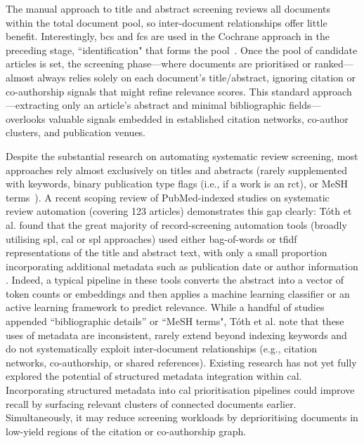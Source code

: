 \documentclass[10pt,oneside]{book}
\begin{document}
The manual approach to title and abstract screening reviews all documents within the total document pool, so inter-document relationships offer little benefit. Interestingly, \gls*{bcs} and \gls*{fcs} are used in the Cochrane approach in the preceding stage, ``identification" that forms the pool~\cite{briscoe_conduct_2020, noauthor_mecir_nodate}. Once the pool of candidate articles is set, the screening phase—where documents are prioritised or ranked—almost always relies solely on each document’s title/abstract, ignoring citation or co-authorship signals that might refine relevance scores. This standard approach—extracting only an article’s abstract and minimal bibliographic fields—overlooks valuable signals embedded in established citation networks, co-author clusters, and publication venues.

Despite the substantial research on automating systematic review screening, most approaches rely almost exclusively on titles and abstracts (rarely supplemented with keywords, binary publication type flags \cite{schneider_evaluation_2022} (i.e., if a work is an \gls*{rct}), or MeSH terms~\cite{wallace_semi-automated_2010}). A recent scoping review of PubMed-indexed studies on systematic review automation (covering 123 articles) demonstrates this gap clearly: Tóth et al. found that the great majority of record-screening automation tools (broadly utilising \gls*{spl}, \gls*{cal} or \gls*{spl} approaches) used either bag-of-words or \gls*{tfidf} representations of the title and abstract text, with only a small proportion incorporating additional metadata such as publication date or author information \cite{toth_automation_2024}. Indeed, a typical pipeline in these tools converts the abstract into a vector of token counts or embeddings and then applies a machine learning classifier or an active learning framework to predict relevance. While a handful of studies appended ``bibliographic details” or ``MeSH terms", Tóth et al. note that these uses of metadata are inconsistent, rarely extend beyond indexing keywords and do not systematically exploit inter-document relationships (e.g., citation networks, co-authorship, or shared references). Existing research has not yet fully explored the potential of structured metadata integration within \gls*{cal}. Incorporating structured metadata into \gls*{cal} prioritisation pipelines could improve recall by surfacing relevant clusters of connected documents earlier. Simultaneously, it may reduce screening workloads by deprioritising documents in low-yield regions of the citation or co-authorship graph. 
\end{document}
